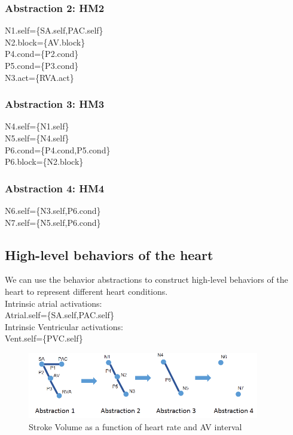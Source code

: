 \documentclass{llncs}
\begin{document}
\subsubsection{Abstraction 2: HM2}
\textsf{N1.self=\{SA.self,PAC.self\}\\
N2.block=\{AV.block\}\\
P4.cond=\{P2.cond\}\\
P5.cond=\{P3.cond\}\\
N3.act=\{RVA.act\}}
\subsubsection{Abstraction 3: HM3}
\textsf{N4.self=\{N1.self\}\\
N5.self=\{N4.self\}\\
P6.cond=\{P4.cond,P5.cond\}\\
P6.block=\{N2.block\}}
\subsubsection{Abstraction 4: HM4}
\textsf{N6.self=\{N3.self,P6.cond\}\\
N7.self=\{N5.self,P6.cond\}}
\subsection{High-level behaviors of the heart}
We can use the behavior abstractions to construct high-level behaviors of the heart to represent different heart conditions.\\
Intrinsic atrial activations:\\
\textsf{Atrial.self=\{SA.self,PAC.self\}}\\
Intrinsic Ventricular activations:\\
\textsf{Vent.self=\{PVC.self\}}
\begin{figure}[!b]
		\centering
		\includegraphics[width=0.9\textwidth]{figs/abs.png}
		\caption{\small Stroke Volume as a function of heart rate and AV interval}
		\label{fig:SV}
\end{figure}
\end{document}

